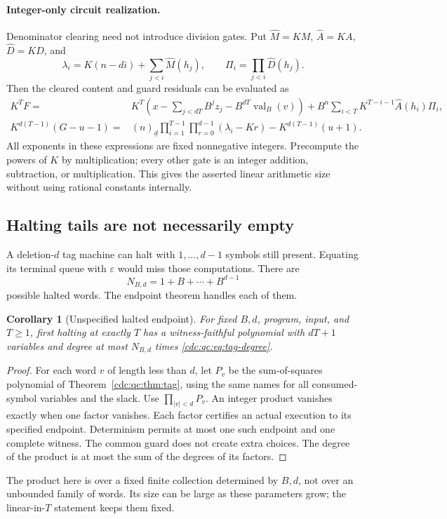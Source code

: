 \documentclass[11pt,a4paper]{article}
\newtheorem{corollary}[corollary]{Corollary}
\theoremstyle{definition}
\theoremstyle{remark}
\newcommand{\eps}{\varepsilon}
\newcommand{\val}{\operatorname{val}}
\newcommand{\ff}[2]{(#1)_{\underline{#2}}}
\begin{document}
\paragraph{Integer-only circuit realization.}
Denominator clearing need not introduce division gates. Put $\widehat M=KM$, $\widehat A=KA$, $\widehat D=KD$, and
\[
 \lambda_i=K(n-di)+\sum_{j<i}\widehat M(h_j),\qquad
 \Pi_i=\prod_{j<i}\widehat D(h_j).
\]
Then the cleared content and guard residuals can be evaluated as
\begin{align*}
 K^TF={}&K^T\!\left(x-\sum_{j<dT}B^jz_j-B^{dT}\val_B(v)\right)
       +B^n\sum_{i<T}K^{T-i-1}\widehat A(h_i)\Pi_i,\\
 K^{d(T-1)}(G-u-1)={}&\ff{n}{d}
     \prod_{i=1}^{T-1}\prod_{r=0}^{d-1}(\lambda_i-Kr)
       -K^{d(T-1)}(u+1).
\end{align*}
All exponents in these expressions are fixed nonnegative integers. Precompute the powers of $K$ by multiplication; every other gate is an integer addition, subtraction, or multiplication. This gives the asserted linear arithmetic size without using rational constants internally.

\subsection{Halting tails are not necessarily empty}
A deletion-$d$ tag machine can halt with $1,\ldots,d-1$ symbols still present. Equating its terminal queue with $\eps$ would miss those computations. There are
\[
 N_{B,d}=1+B+\cdots+B^{d-1}
\]
possible halted words. The endpoint theorem handles each of them.

\begin{corollary}[Unspecified halted endpoint]\label{cdc:qc:cor:halting-tail}
For fixed $B,d$, program, input, and $T\geq1$, first halting at exactly $T$ has a witness-faithful polynomial with $dT+1$ variables and degree at most $N_{B,d}$ times \eqref{cdc:qc:eq:tag-degree}.
\end{corollary}
\begin{proof}
For each word $v$ of length less than $d$, let $P_v$ be the sum-of-squares polynomial of Theorem~\ref{cdc:qc:thm:tag}, using the same names for all consumed-symbol variables and the slack. Use $\prod_{|v|<d}P_v$. An integer product vanishes exactly when one factor vanishes. Each factor certifies an actual execution to its specified endpoint. Determinism permits at most one such endpoint and one complete witness. The common guard does not create extra choices. The degree of the product is at most the sum of the degrees of its factors.
\end{proof}
The product here is over a fixed finite collection determined by $B,d$, not over an unbounded family of words. Its size can be large as these parameters grow; the linear-in-$T$ statement keeps them fixed.
\end{document}
